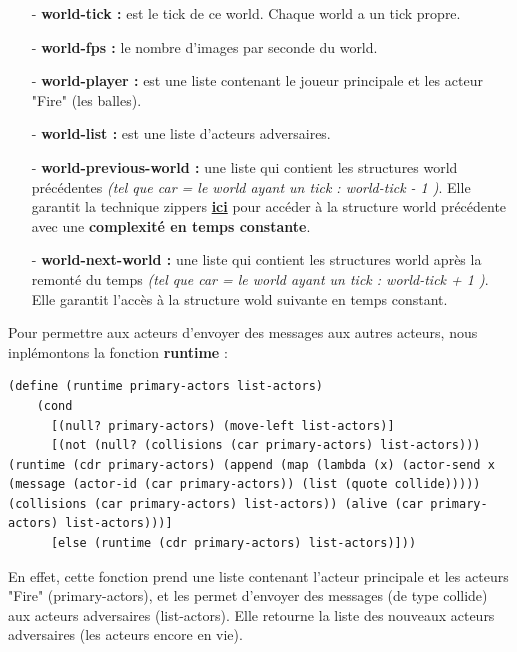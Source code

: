 \documentclass[a4paper]{article}
\begin{document}
\begin{itemize}
    \item[-] \textbf{world-tick :} est le tick de ce world. Chaque world a un tick propre.
    \item[-] \textbf{world-fps :} le nombre d'images par seconde du world.
    \item[-] \textbf{world-player :} est une liste contenant le joueur principale et les acteur "Fire" (les balles).
    \item[-] \textbf{world-list :} est une liste d'acteurs adversaires.
    \item[-] \textbf{world-previous-world :} une liste qui contient les structures world précédentes \textit{(tel que car = le world ayant un tick : world-tick - 1 )}. Elle garantit la technique zippers \href{https://en.wikipedia.org/wiki/Zipper_(data_structure)?fbclid=IwAR1EkA6fp8uKhW7-CCY9jwM4Hn_r0YFGuEccYER7Vhui6xVvU5Lscca5iwY}{\textbf{ici}} pour accéder à la structure world précédente avec une \textbf{complexité en temps constante}.
    \item[-] \textbf{world-next-world :} une liste qui contient les structures world après la remonté du temps \textit{(tel que car = le world ayant un tick : world-tick + 1 )}. Elle garantit l'accès à la structure wold suivante en temps constant. 
\end{itemize}

\vspace{0.3cm}

Pour permettre aux acteurs d'envoyer des messages aux autres acteurs, nous inplémontons la fonction \textbf{runtime} : 
\begin{lstlisting}
(define (runtime primary-actors list-actors)
    (cond
      [(null? primary-actors) (move-left list-actors)]
      [(not (null? (collisions (car primary-actors) list-actors))) (runtime (cdr primary-actors) (append (map (lambda (x) (actor-send x (message (actor-id (car primary-actors)) (list (quote collide))))) (collisions (car primary-actors) list-actors)) (alive (car primary-actors) list-actors)))]
      [else (runtime (cdr primary-actors) list-actors)]))
\end{lstlisting}
En effet, cette fonction prend une liste contenant l'acteur principale et les acteurs "Fire" (primary-actors), et les permet d'envoyer des messages (de type collide) aux acteurs adversaires (list-actors). Elle retourne la liste des nouveaux acteurs adversaires (les acteurs encore en vie). 

\end{document}

